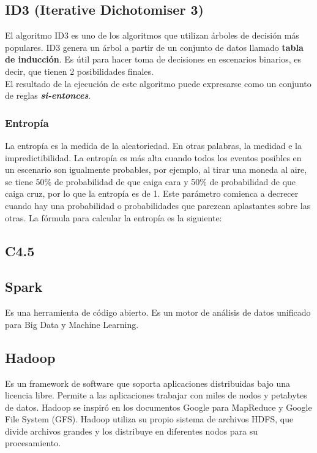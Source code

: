 \subsection{ID3 (Iterative Dichotomiser 3)} \label{id3}

El algoritmo ID3 es uno de los algoritmos que utilizan árboles de decisión más populares. ID3 genera un árbol a partir de un conjunto de datos llamado \textbf{tabla de inducción}. Es útil para hacer toma de decisiones en escenarios binarios, es decir, que tienen 2 posibilidades finales.\\

El resultado de la ejecución de este algoritmo puede expresarse como un conjunto de reglas \textbf{\textit{si-entonces}}.

\subsubsection{Entropía}
La entropía es la medida de la aleatoriedad. En otras palabras, la medidad e la impredictibilidad. La entropía es más alta cuando todos los eventos posibles en un escenario son igualmente probables, por ejemplo, al tirar una moneda al aire, se tiene 50\% de probabilidad de que caiga cara y 50\% de probabilidad de que caiga cruz, por lo que la entropía es de 1. Este parámetro comienca a decrecer cuando hay una probabilidad o probabilidades que parezcan aplastantes sobre las otras. La fórmula para calcular la entropía es la siguiente:

\subsection{C4.5} \label{c4.5}

\subsection{Spark}
Es una herramienta de código abierto. Es un motor de análisis de datos unificado para Big Data y Machine Learning. 
\subsection{Hadoop}
Es un framework de software que soporta aplicaciones distribuidas bajo una licencia libre. Permite a las aplicaciones trabajar con miles de nodos y petabytes de datos. Hadoop se inspiró en los documentos Google para MapReduce y Google File System (GFS). Hadoop utiliza su propio sistema de archivos HDFS, que divide archivos grandes y los distribuye en diferentes nodos para su procesamiento.

